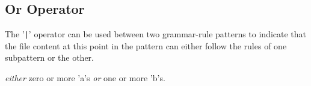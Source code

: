 
\subsection{Or Operator}
{
	The '\texttt{|}' operator can be used between two grammar-rule patterns
	to indicate that the file content at this point in the pattern can either
	follow the rules of one subpattern
	or the other.
	
	\begin{itemize}
	{
		\item[\texttt{"a"* | "b"+}] \textit{either} zero or more 'a's
			\textit{or} one or more 'b's.
	}
	\end{itemize}
}
